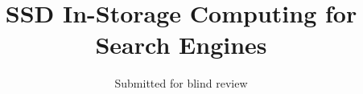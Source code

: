 

\title{SSD In-Storage Computing for Search Engines}


\author{Submitted for blind review}
\maketitle



















